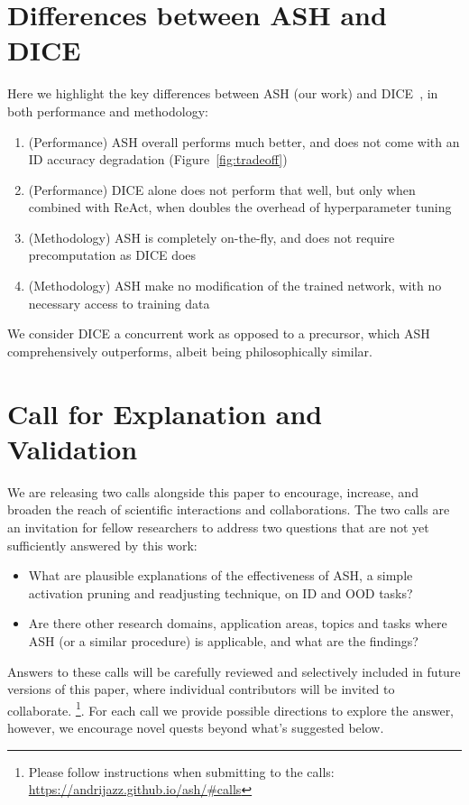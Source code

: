 \documentclass{article}
\newcommand{\figref}[1]{Figure~\ref{fig:#1}}
\newcommand{\seclabel}[1]{\label{sec:#1}}
\begin{document}
\section{Differences between ASH and DICE}
\seclabel{diff_ash_vs_dice}

Here we highlight the key differences between ASH (our work) and DICE~\citep{sun2022dice}, in both performance and methodology:
\begin{enumerate}
    \item (Performance) ASH overall performs much better, and does not come with an ID accuracy degradation (\figref{tradeoff})
    \item (Performance) DICE alone does not perform that well, but only when combined with ReAct, when doubles the overhead of hyperparameter tuning
    \item (Methodology) ASH is completely on-the-fly, and does not require precomputation as DICE does
    \item (Methodology) ASH make no modification of the trained network, with no necessary access to training data
\end{enumerate}

We consider DICE a concurrent work as opposed to a precursor, which ASH comprehensively outperforms, albeit being philosophically similar.








\section{Call for Explanation and Validation}
\seclabel{calls}

We are releasing two calls alongside this paper to encourage, increase, and broaden the reach of scientific interactions and collaborations. The two calls are an invitation for fellow researchers to address two questions that are not yet sufficiently answered by this work:
\begin{itemize}
    \item What are plausible explanations of the effectiveness of ASH, a simple activation pruning and readjusting technique, on ID and OOD tasks?
    \item Are there other research domains, application areas, topics and tasks where ASH (or a similar procedure) is applicable, and what are the findings?
\end{itemize}

Answers to these calls will be carefully reviewed and selectively included in future versions of this paper, where individual contributors will be invited to collaborate.
\footnote{Please follow instructions when submitting to the calls:  \url{https://andrijazz.github.io/ash/\#calls}}.
For each call we provide possible directions to explore the answer, however, we encourage novel quests beyond what's suggested below.
\end{document}
